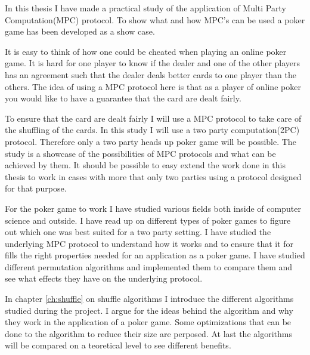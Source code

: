 In this thesis I have made a practical study of the application of Multi Party Computation(MPC) protocol. To show what and how MPC's can be used a poker game has been developed as a show case.

It is easy to think of how one could be cheated when playing an online poker game. It is hard for one player to know if the dealer and one of the other players has an agreement such that the dealer deals better cards to one player than the others. The idea of using a MPC protocol here is that as a player of online poker you would like to have a guarantee that the card are dealt fairly.

To ensure that the card are dealt fairly I will use a MPC protocol to take care of the shuffling of the cards. In this study I will use a two party computation(2PC) protocol. Therefore only a two party heads up poker game will be possible. The study is a showcase of the possibilities of MPC protocols and what can be achieved by them. It should be possible to easy extend the work done in this thesis to work in cases with more that only two parties using a protocol designed for that purpose.

\bigskip

For the poker game to work I have studied various fields both inside of computer science and outside. I have read up on different types of poker games to figure out which one was best suited for a two party setting. I have studied the underlying MPC protocol to understand how it works and to ensure that it for fills the right properties needed for an application as a poker game. I have studied different permutation algorithms and implemented them to compare them and see what effects they have on the underlying protocol.

\bigskip

In chapter \ref{ch:shuffle} on shuffle algorithms I introduce the different algorithms studied during the project. I argue for the ideas behind the algorithm and why they work in the application of a poker game. Some optimizations that can be done to the algorithm to reduce their size are perposed. At last the algorithms will be compared on a teoretical level to see different benefits.



